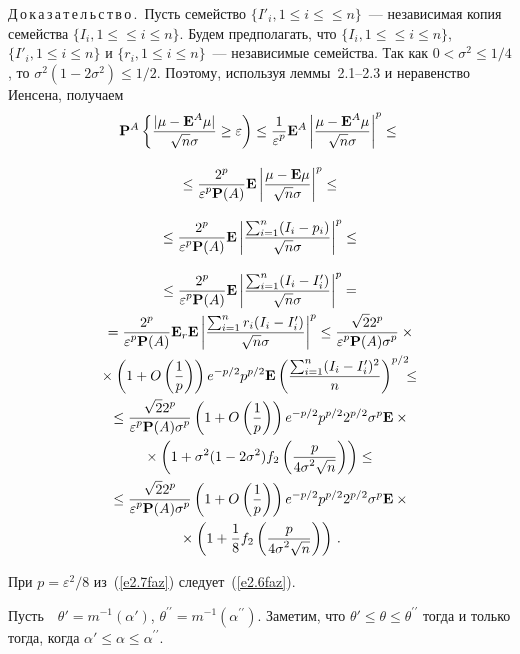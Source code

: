 \begin{multicols}{2}
\noindent
Д\,о\,к\,а\,з\,а\,т\,е\,л\,ь\,с\,т\,в\,о\,.\ Пусть  семейство $\{I'_i, 1\le i\le$\linebreak $\le n\}$~---
независимая копия семейства $\{I_i, 1\le$\linebreak $\le i\le n\}$. Будем
предполагать, что $\{I_i, 1\le$\linebreak $\le i\le n\}$, $\{I'_i, 1\le i\le n\}$ и
$\{r_i, 1\le i\le n\}$~--- независимые семейства. Так как
$0<\sigma^2\le 1/4$, то
$\sigma^2(1-2\sigma^2)\le {1}/{2}$. Поэтому, используя леммы~2.1--2.3 и неравенство Иенсена,
 получаем
\begin{multline}
\P^A\left\{\fr{|\mu-{\E}^A\mu|}{\sqrt{n}\sigma} \ge
\varepsilon\right)\le
\fr{1}{\varepsilon^p}{\E^A}\left|\fr{\mu-{\E}^A\mu}{\sqrt{n}\sigma}\right|^p
\le{}\\[9pt]
{}\le \fr{2^p}{\varepsilon^p\P(A)}{\E}\left|\frac{\mu-{\E}\mu}{\sqrt{n}{\sigma}}\right|^p
\le{}\\[9pt]
{}
\le\fr{2^p}{\varepsilon^p\P(A)}{\E}\left|\frac{\sum_{i=1}^n(I_i-p_i)}{\sqrt{n}{\sigma}}\right|^p \le{}\\[9pt]
{}
\le\fr{2^p}{\varepsilon^p\P(A)}{\E}\left|\frac{\sum_{i=1}^n(I_i-I'_i)}{\sqrt{n}{\sigma}}\right|^p={}\\
{}
=\fr{2^p}{\varepsilon^p\P(A)}{\E_r}{\E}\left|\frac{\sum_{i=1}^nr_i
(I_i-I'_i)}{\sqrt{n}{\sigma}}\right|^p
\le\fr{\sqrt{2}2^p}{\varepsilon^p\P(A)\sigma^p
}\times{}\\
{}\times \left(1+O\left(\fr{1}{p}\right)\right)e^{-p/2}
p^{p/2}{\E}\left(\frac{\sum_{i=1}^n
(I_i-I'_i)^2}{n}\right)^{p/2}\!\!\!\le{}\\
{}
\le\fr{\sqrt{2}2^p}{\varepsilon^p\P(A)\sigma^p
}\left(1+O\left(\fr{1}{p}\right)\right)e^{-{p}/{2}} p^{
{p}/{2}} 2^{{p}/{2}}\sigma^p{\E}\times{}\\
{}\times
\left(1+\sigma^2(1-2\sigma^2)
f_2\left(\fr{p}{4\sigma^2\sqrt {n}}\right)\right)\le{}\\
{}
\le\fr{\sqrt{2}2^p}{\varepsilon^p\P(A)\sigma^p
}\left(1+O\left(\fr{1}{p}\right)\right)e^{-{p}/{2}} 
p^{{p}/{2}}2^{{p}/{2}}\sigma^p{\E}\times{}\\
{}\times
\left(1+\fr{1}{8}
f_2\left(\fr{p}{4\sigma^2\sqrt {n}}\right)\right)\,. 
\label{e2.7faz}
\end{multline}

При $p={\varepsilon^2}/{8}$ из~(\ref{e2.7faz}) следует~(\ref{e2.6faz}).

 Пусть\ \, $ \theta'=m^{-1}( \alpha')$, $
\theta^{\prime\prime}=m^{-1}( \alpha^{\prime\prime})$. Заметим, что $ \theta'\le \theta
\le \theta^{\prime\prime}$ тогда и только тогда, когда $ \alpha'\le \alpha\le
\alpha^{\prime\prime}$.



\end{multicols}
